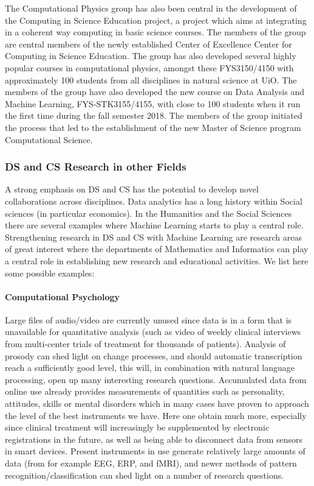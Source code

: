 \documentclass[a4paper,10pt]{article}
\begin{document}
The Computational Physics group has also been central in the
development of the Computing in Science Education project, a project
which aims at integrating in a coherent way computing in basic science
courses. The members of the group are central members of the newly
established Center of Excellence Center for Computing in Science
Education.  The group has also developed several highly popular
courses in computational physics, amongst these FYS3150/4150 with
approximately 100 students from all disciplines in natural science at
UiO. The members of the group have also developed the new course on
Data Analysis and Machine Learning, FYS-STK3155/4155, with close to
100 students when it run the first time during the fall semester
2018. The members of the group initiated the process that led to the
establishment of the new Master of Science program Computational
Science.



\subsubsection*{DS and CS Research in other Fields}

A strong emphasis on DS and CS has the potential to develop novel collaborations across disciplines. Data analytics has a long history within Social sciences (in particular economics). In the Humanities and the Social Sciences there are several examples where Machine Learning starts to play a central role. Strengthening research in DS and CS with Machine Learning are research areas of great interest where the departments of Mathematics and Informatics can play a central role in establishing new research and educational activities. We list here some possible examples:


\paragraph{Computational Psychology}
Large files of audio/video are currently unused since data is in a form that is unavailable for quantitative analysis (such as video of weekly clinical interviews from multi-center trials of treatment for thousands of patients). Analysis of prosody can shed light on change processes, and should automatic transcription reach a sufficiently good level, this will, in combination with natural language processing, open up many interesting research questions.
Accumulated data from online use already provides measurements of quantities such as personality, attitudes, skills or mental disorders which in many cases have proven to approach the level of the best instruments we have. Here one obtain much more, especially since clinical treatment will increasingly be supplemented by electronic registrations in the future, as well as being able to disconnect data from sensors in smart devices. Present instruments in use generate relatively large amounts of data (from for example EEG, ERP, and fMRI), and newer methods of pattern recognition/classification can shed light on a number of research questions.
\end{document}
